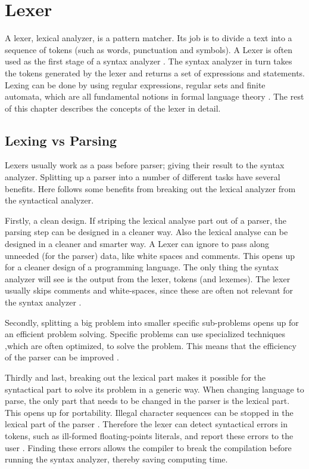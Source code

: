 \chapter{Lexer \label{chap:lexer}}
A lexer, lexical analyzer, is a pattern matcher. Its job is to divide a text
into a sequence of tokens (such as words, punctuation and symbols). A Lexer is
often used as the first stage of a syntax analyzer \cite{sebesta2012}. The syntax
analyzer in turn takes the tokens generated by the lexer and returns a set of
expressions and statements. Lexing can be done by using regular expressions,
regular sets and finite automata, which are all fundamental notions in
formal language theory \cite{Aho1990}. The rest of this chapter describes the
concepts of the lexer in detail.

\section{Lexing vs Parsing}
Lexers usually work as a pass before parser; giving their result to the syntax
analyzer. Splitting up a parser into a number of different tasks have several
benefits. Here follows some benefits from breaking out the lexical analyzer from
the syntactical analyzer.

Firstly, a clean design. If striping the lexical analyse part out of a parser,
the parsing step can be designed in a cleaner way. Also the lexical analyse can
be designed in a cleaner and smarter way. A Lexer can ignore to pass along
unneeded (for the parser) data, like white spaces and comments. This opens up
for a cleaner design of a programming language. The only thing the syntax
analyzer will see is the output from the lexer, tokens (and lexemes). The lexer
usually skips comments and white-spaces, since these are often not relevant for
the syntax analyzer \cite{Aho2006}.

Secondly, splitting a big problem into smaller specific sub-problems opens up
for an efficient problem solving. Specific problems can use specialized techniques
,which are often optimized, to solve the problem. This means that the efficiency
of the parser can be improved \cite{Aho2006}.

Thirdly and last, breaking out the lexical part makes it possible for the
syntactical part to solve its problem in a generic way. When changing language
to parse, the only part that needs to be changed in the parser is the lexical
part. This opens up for portability. Illegal character sequences can be stopped
in the lexical part of the parser \cite{Aho2006}. Therefore the lexer can detect
syntactical errors in tokens, such as ill-formed floating-points literals, and
report these errors to the user \cite{sebesta2012}. Finding these errors allows
the compiler to break the compilation before running the syntax analyzer,
thereby saving computing time.

